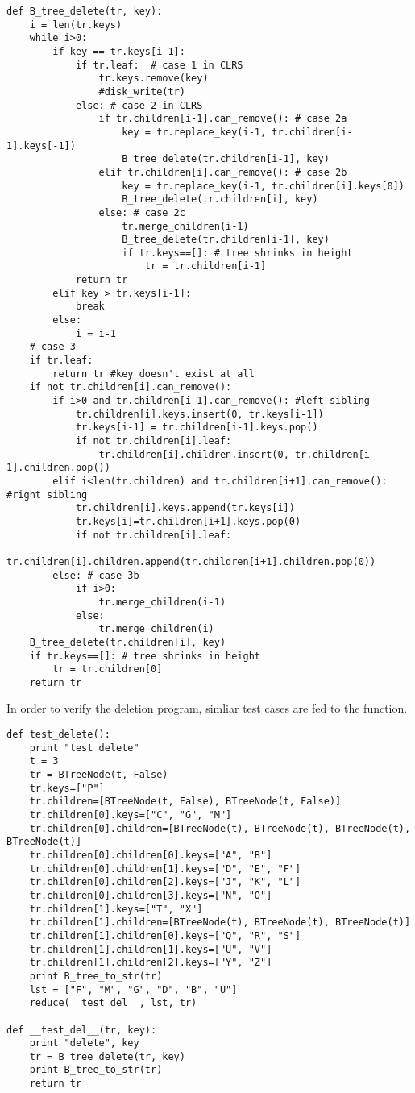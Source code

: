 \documentclass{article}
\begin{document}
\begin{lstlisting}
def B_tree_delete(tr, key):
    i = len(tr.keys)
    while i>0:
        if key == tr.keys[i-1]:
            if tr.leaf:  # case 1 in CLRS
                tr.keys.remove(key)
                #disk_write(tr)
            else: # case 2 in CLRS
                if tr.children[i-1].can_remove(): # case 2a
                    key = tr.replace_key(i-1, tr.children[i-1].keys[-1])
                    B_tree_delete(tr.children[i-1], key)
                elif tr.children[i].can_remove(): # case 2b
                    key = tr.replace_key(i-1, tr.children[i].keys[0])
                    B_tree_delete(tr.children[i], key)
                else: # case 2c
                    tr.merge_children(i-1)
                    B_tree_delete(tr.children[i-1], key)
                    if tr.keys==[]: # tree shrinks in height
                        tr = tr.children[i-1]
            return tr
        elif key > tr.keys[i-1]:
            break
        else:
            i = i-1
    # case 3
    if tr.leaf:
        return tr #key doesn't exist at all
    if not tr.children[i].can_remove():
        if i>0 and tr.children[i-1].can_remove(): #left sibling
            tr.children[i].keys.insert(0, tr.keys[i-1])
            tr.keys[i-1] = tr.children[i-1].keys.pop()
            if not tr.children[i].leaf:
                tr.children[i].children.insert(0, tr.children[i-1].children.pop())
        elif i<len(tr.children) and tr.children[i+1].can_remove(): #right sibling
            tr.children[i].keys.append(tr.keys[i])
            tr.keys[i]=tr.children[i+1].keys.pop(0)
            if not tr.children[i].leaf:
                tr.children[i].children.append(tr.children[i+1].children.pop(0))
        else: # case 3b
            if i>0:
                tr.merge_children(i-1)
            else:
                tr.merge_children(i)
    B_tree_delete(tr.children[i], key)
    if tr.keys==[]: # tree shrinks in height
        tr = tr.children[0]
    return tr
\end{lstlisting}

In order to verify the deletion program, simliar test cases are
fed to the function.

\begin{lstlisting}
def test_delete():
    print "test delete"
    t = 3
    tr = BTreeNode(t, False)
    tr.keys=["P"]
    tr.children=[BTreeNode(t, False), BTreeNode(t, False)]
    tr.children[0].keys=["C", "G", "M"]
    tr.children[0].children=[BTreeNode(t), BTreeNode(t), BTreeNode(t), BTreeNode(t)]
    tr.children[0].children[0].keys=["A", "B"]
    tr.children[0].children[1].keys=["D", "E", "F"]
    tr.children[0].children[2].keys=["J", "K", "L"]        
    tr.children[0].children[3].keys=["N", "O"]
    tr.children[1].keys=["T", "X"]
    tr.children[1].children=[BTreeNode(t), BTreeNode(t), BTreeNode(t)]
    tr.children[1].children[0].keys=["Q", "R", "S"]
    tr.children[1].children[1].keys=["U", "V"]
    tr.children[1].children[2].keys=["Y", "Z"]
    print B_tree_to_str(tr)
    lst = ["F", "M", "G", "D", "B", "U"]
    reduce(__test_del__, lst, tr)

def __test_del__(tr, key):
    print "delete", key
    tr = B_tree_delete(tr, key)
    print B_tree_to_str(tr)
    return tr
\end{lstlisting}
\end{document}
